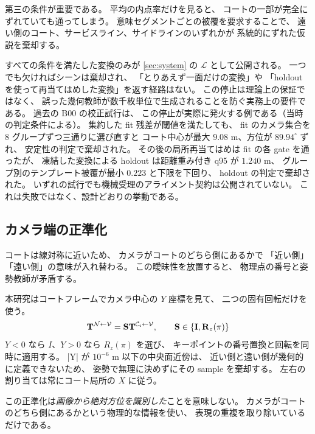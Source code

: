 第三の条件が重要である。
平均の内点率だけを見ると、
コートの一部が完全にずれていても通ってしまう。
意味セグメントごとの被覆を要求することで、
遠い側のコート、サービスライン、サイドラインのいずれかが
系統的にずれた仮説を棄却する。

すべての条件を満たした変換のみが
\cref{sec:system} の \(\mathcal{L}\) として公開される。
一つでも欠ければシーンは棄却され、
「とりあえず一面だけの変換」や
「holdout を使って再当てはめした変換」を返す経路はない。
この停止は理論上の保証ではなく、
誤った幾何教師が数千枚単位で生成されることを防ぐ実務上の要件である。
過去の B00 の校正試行は、
この停止が実際に発火する例である（当時の判定条件による）。
集約した fit 残差が閾値を満たしても、
fit のカメラ集合を 8 グループずつ三通りに選び直すと
コート中心が最大 \(9.08\) m、方位が \(89.94^\circ\) ずれ、
安定性の判定で棄却された。
その後の局所再当てはめは fit の各 gate を通ったが、
凍結した変換による holdout は距離重み付き q95 が \(1.240\) m、
グループ別のテンプレート被覆が最小 \(0.223\) と下限を下回り、
holdout の判定で棄却された。
いずれの試行でも機械受理のアライメント契約は公開されていない。
これは失敗ではなく、設計どおりの挙動である。

\subsection{カメラ端の正準化}
\label{sec:canonicalization}

コートは線対称に近いため、
カメラがコートのどちら側にあるかで
「近い側」「遠い側」の意味が入れ替わる。
この曖昧性を放置すると、
物理点の番号と姿勢教師が矛盾する。

本研究はコートフレームでカメラ中心の \(Y\) 座標を見て、
二つの固有回転だけを使う。
\begin{equation}
  \mathbf{T}^{\mathcal{N}\leftarrow \mathcal{V}}=\mathbf{S}\mathbf{T}^{\mathcal{C}_i\leftarrow \mathcal{V}},
  \qquad \mathbf{S}\in\{\mathbf{I},\mathbf{R}_z(\pi)\}
  \label{eq:canonical_pose}
\end{equation}
\(Y<0\) なら \(I\)、\(Y>0\) なら \(R_z(\pi)\) を選び、
キーポイントの番号置換と回転を同時に適用する。
|Y| が \(10^{-6}\) m 以下の中央面近傍は、
近い側と遠い側が幾何的に定義できないため、
姿勢で無理に決めずにその sample を棄却する。
左右の割り当ては常にコート局所の \(X\) に従う。

この正準化は\emph{画像から絶対方位を識別した}ことを意味しない。
カメラがコートのどちら側にあるかという物理的な情報を使い、
表現の重複を取り除いているだけである。
